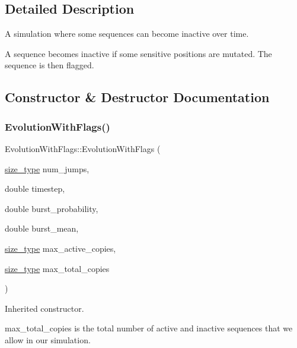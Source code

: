 \subsection{Detailed Description}
A simulation where some sequences can become inactive over time. 

A sequence becomes inactive if some sensitive positions are mutated. The sequence is then \textquotesingle{}flagged\textquotesingle{}. 

\subsection{Constructor \& Destructor Documentation}
\mbox{\label{classretrocombinator_1_1EvolutionWithFlags_a4e7809583d5dcf9cf9c1155587d7e99e}} 
\subsubsection{\texorpdfstring{Evolution\+With\+Flags()}{EvolutionWithFlags()}}
{\footnotesize\ttfamily Evolution\+With\+Flags\+::\+Evolution\+With\+Flags (\begin{DoxyParamCaption}\item[{\hyperlink{constants_8h_a8e1541b50cee66a791df4c437ccbb385}{size\+\_\+type}}]{num\+\_\+jumps,  }\item[{double}]{timestep,  }\item[{double}]{burst\+\_\+probability,  }\item[{double}]{burst\+\_\+mean,  }\item[{\hyperlink{constants_8h_a8e1541b50cee66a791df4c437ccbb385}{size\+\_\+type}}]{max\+\_\+active\+\_\+copies,  }\item[{\hyperlink{constants_8h_a8e1541b50cee66a791df4c437ccbb385}{size\+\_\+type}}]{max\+\_\+total\+\_\+copies }\end{DoxyParamCaption})}



Inherited constructor. 

{\ttfamily max\+\_\+total\+\_\+copies} is the total number of active and inactive sequences that we allow in our simulation. 

